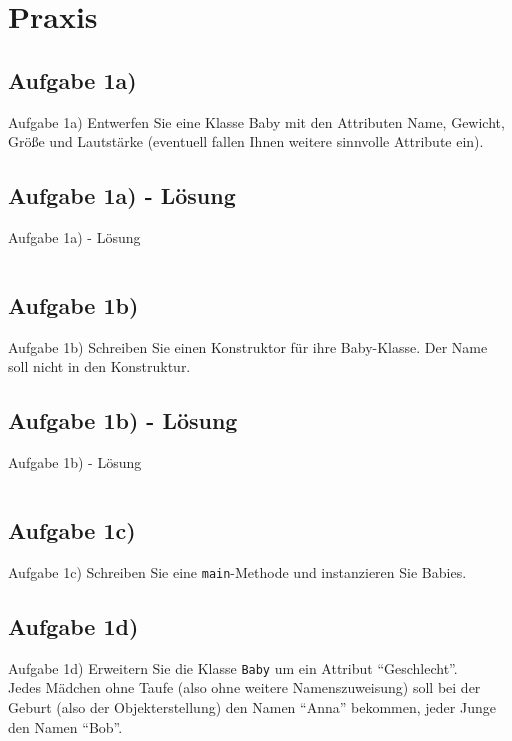\documentclass[usepdftitle=false,hyperref={pdfpagelabels=false}]{beamer}
\begin{document}
\section{Praxis}
\subsection{Aufgabe 1a)}
\begin{frame}{Aufgabe 1a)}
    Entwerfen Sie eine Klasse Baby mit den Attributen Name, Gewicht, 
    Größe und Lautstärke (eventuell fallen Ihnen weitere sinnvolle 
    Attribute ein).
\end{frame}

\subsection{Aufgabe 1a) - Lösung}
\begin{frame}{Aufgabe 1a) - Lösung}
    \inputminted[linenos, numbersep=5pt, tabsize=4, frame=lines, label=Baby.java, fontsize=\tiny]{java}{Baby.java}
\end{frame}

\subsection{Aufgabe 1b)}
\begin{frame}{Aufgabe 1b)}
    Schreiben Sie einen Konstruktor für ihre Baby-Klasse. Der Name
    soll nicht in den Konstruktur.
\end{frame}

\subsection{Aufgabe 1b) - Lösung}
\begin{frame}{Aufgabe 1b) - Lösung}
    \inputminted[linenos, numbersep=5pt, tabsize=4, frame=lines, label=Baby.java, fontsize=\tiny]{java}{Baby-02.java}
\end{frame}

\subsection{Aufgabe 1c)}
\begin{frame}{Aufgabe 1c)}
    Schreiben Sie eine \texttt{main}-Methode und instanzieren Sie Babies.
\end{frame}

\subsection{Aufgabe 1d)}
\begin{frame}{Aufgabe 1d)}
    Erweitern Sie die Klasse \texttt{Baby} um ein Attribut "`Geschlecht"'.\\

    Jedes Mädchen ohne Taufe ({\tiny also ohne weitere Namenszuweisung}) 
    soll  bei der Geburt ({\tiny also der Objekterstellung}) den Namen "`Anna"'
    bekommen, jeder Junge den Namen "`Bob"'.
\end{frame}
\end{document}
